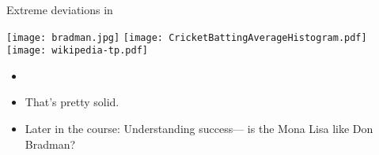 

\begin{frame}
  \frametitle{}

  \begin{block}{Extreme deviations in }
      
    \begin{center}
      \texttt{[image: bradman.jpg]}
      \texttt{[image: CricketBattingAverageHistogram.pdf]}
      \texttt{[image: wikipedia-tp.pdf]}
    \end{center}
    \begin{itemize}
    \item<2->
    \item<3->
      That's pretty solid.
    \item<4->
      Later in the course: Understanding success--- \newline
      is the Mona Lisa like Don Bradman?
    \end{itemize}
  \end{block}

\end{frame}

